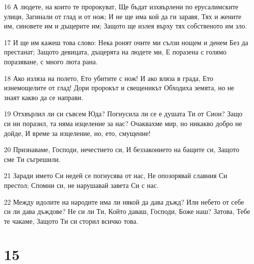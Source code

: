 \par 16 А людете, на които те пророкуват, Ще бъдат изхвърлени по ерусалимските улици, Загинали от глад и от нож; И не ще има кой да ги заравя, Тях и жените им, синовете им и дъщерите им; Защото ще излея върху тях собственото им зло.
\par 17 И ще им кажеш това слово: Нека ронят очите ми сълзи нощем и денем Без да престанат; Защото девицата, дъщерята на людете ми, Е поразена с голямо поразяване, с много люта рана.
\par 18 Ако изляза на полето, Ето убитите с нож! И ако вляза в града, Ето изнемощелите от глад! Дори пророкът и свещеникът Обходиха земята, но не знаят какво да се направи.
\par 19 Отхвърлил ли си съвсем Юда? Погнусила ли се е душата Ти от Сион? Защо си ни поразил, та няма изцеление за нас? Очаквахме мир, но никакво добро не дойде, И време за изцеление, но, ето, смущение!
\par 20 Признаваме, Господи, нечестието си, И беззаконието на бащите си, Защото сме Ти съгрешили.
\par 21 Заради името Си недей се погнусява от нас, Не опозорявай славния Си престол; Спомни си, не нарушавай завета Си с нас.
\par 22 Между идолите на народите има ли някой да дава дъжд? Или небето от себе си ли дава дъждове? Не си ли Ти, Който даваш, Господи, Боже наш? Затова, Тебе те чакаме, Защото Ти си сторил всичко това.

\chapter{15}

